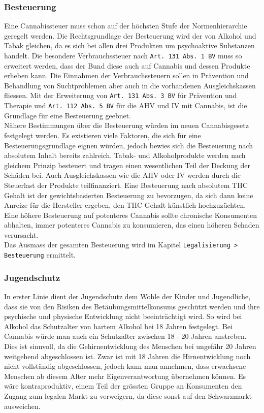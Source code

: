 \documentclass[../main.tex]{subfiles}
\begin{document}
	 \subsubsection{Besteuerung}
	 Eine Cannabissteuer muss schon auf der höchsten Stufe der Normenhierarchie geregelt werden. 
	 Die Rechtsgrundlage der Besteuerung wird der von Alkohol und Tabak gleichen, da es sich bei allen drei Produkten um psychoaktive Substanzen handelt.
	 Die besondere Verbrauchssteuer nach \texttt{Art. 131 Abs. 1 BV} muss so erweitert werden, dass der Bund diese auch auf Cannabis und dessen Produkte erheben kann.
	 Die Einnahmen der Verbrauchssteuern sollen in Prävention und Behandlung von Suchtproblemen aber auch in die vorhandenen Ausgleichskassen fliessen.
	 Mit der Erweiterung von \texttt{Art. 131 Abs. 3 BV} für Prävention und Therapie und \texttt{Art. 112 Abs. 5 BV} für die AHV und IV mit Cannabis, ist die Grundlage für eine Besteuerung geebnet.\\
	 
	 \noindent
	 Nähere Bestimmungen über die Besteuerung würden im neuen Cannabisgesetz festgelegt werden.
	 Es existieren viele Faktoren, die sich für eine Besteuerungsgrundlage eignen würden, jedoch bewies sich die Besteuerung nach absolutem Inhalt bereits zahlreich.
	 Tabak- und Alkoholprodukte werden nach gleichem Prinzip besteuert und tragen einen wesentlichen Teil der Deckung der Schäden bei.
	 Auch Ausgleichskassen wie die AHV oder IV werden durch die Steuerlast der Produkte teilfinanziert.
	 Eine Besteuerung nach absolutem THC Gehalt ist der gewichtsbasierten Besteuerung zu bevorzugen, da sich dann keine Anreize für die Hersteller ergeben, den THC Gehalt künstlich hochzuzüchten.
	 Eine höhere Besteuerung auf potenteres Cannabis sollte chronische Konsumenten abhalten, immer potenteres Cannabis zu konsumieren, das einen höheren Schaden verursacht. \\
	 
	 \noindent
	 Das Ausmass der gesamten Besteuerung wird im Kapitel \texttt{Legalisierung > Besteuerung} ermittelt.
	 
	 
	 \subsubsection{Jugendschutz}
	 In erster Linie dient der Jugendschutz dem Wohle der Kinder und Jugendliche, dass sie von den Risiken des Betäubungsmittelkonsums geschützt werden und ihre psychische und physische Entwicklung nicht beeinträchtigt wird. 
	 So wird bei Alkohol das Schutzalter von hartem Alkohol bei 18 Jahren festgelegt. 
	 Bei Cannabis würde man auch ein Schutzalter zwischen 18 - 20 Jahren anstreben. 
	 Dies ist sinnvoll, da die Gehirnentwicklung des Menschen bei ungefähr 20 Jahren weitgehend abgeschlossen ist. 
	 Zwar ist mit 18 Jahren die Hirnentwicklung noch nicht vollständig abgeschlossen, jedoch kann man annehmen, dass erwachsene Menschen ab diesem Alter mehr Eigenverantwortung übernehmen können. 
	 Es wäre kontraproduktiv, einem Teil der grössten Gruppe an Konsumenten den Zugang zum legalen Markt zu verweigern, da diese sonst auf den Schwarzmarkt ausweichen. \\
	 
\end{document}
